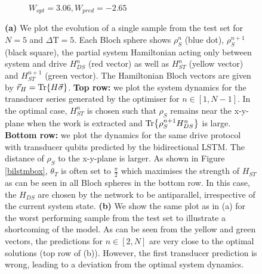 \begin{figure}[H]
\begin{subfigure}{0.85\textwidth}
		\caption{$W_{opt} = 3.06, W_{pred} = -2.65$}
		\label{bloch_worst}
	\end{subfigure}
	\caption{\textbf{(a)} We plot the evolution of a single sample from the test set for $N=5$ and $\Delta \mathrm{T} = 5$. Each Bloch sphere shows $\rho_S^n$ (blue dot), $\rho_S^{n+1}$ (black square), the partial system Hamiltonian acting only between system and drive $H_{DS}^n$ (red vector) as well as $H_{ST}^n$ (yellow vector) and $H_{ST}^{n+1}$ (green vector). The Hamiltonian Bloch vectors are given by $\vec{r}_H = \Tr{H \vec{\sigma}}$. \textbf{Top row:} we plot the system dynamics for the transducer series generated by the optimiser for $n \in [1, N - 1]$. In the optimal case, $H_{ST}^n$ is chosen such that $\rho_S$ remains near the x-y-plane when the work is extracted and $\Tr{\rho_S^{n+1} H_{DS}^n}$ is large. \textbf{Bottom row:} we plot the dynamics for the same drive protocol with transducer qubits predicted by the bidirectional LSTM. The distance of $\rho_S$ to the x-y-plane is larger. As shown in Figure \ref{bilstmbox}, $\theta_T$ is often set to $\frac{\pi}{2}$ which maximises the strength of $H_{ST}$ as can be seen in all Bloch spheres in the bottom row. In this case, the $H_{DS}$ are chosen by the network to be antiparallel, irrespective of the current system state.
	\textbf{(b)} We show the same plot as in (a) for the worst performing sample from the test set to illustrate a shortcoming of the model. As can be seen from the yellow and green vectors, the predictions for $n \in [2, N]$ are very close to the optimal solutions (top row of (b)). However, the first transducer prediction is wrong, leading to a deviation from the optimal system dynamics.}
	\label{n_5_blochs}
\end{figure}

